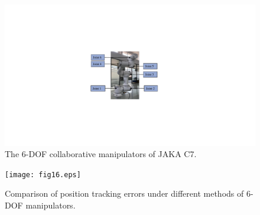 \documentclass[pdflatex,sn-mathphys-num]{sn-jnl}%
\theoremstyle{thmstyleone}%
\theoremstyle{thmstyletwo}%
\theoremstyle{thmstylethree}%
\begin{document}

\begin{figure}[H]
	\centering
	\includegraphics[width=0.4\linewidth]{fig15.pdf}
	\caption{The 6-DOF collaborative manipulators of JAKA C7.}
	\label{fig:15}
\end{figure}



\begin{figure}[H]
	\centering
	\texttt{[image: fig16.eps]}
	\caption{Comparison of position tracking errors under different methods of 6-DOF manipulators.}
	\label{fig:16}
\end{figure}
\end{document}
